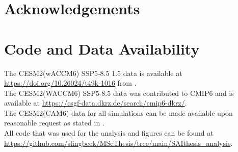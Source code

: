 \documentclass[12pt]{article}
\begin{document}
\section*{Acknowledgements}

\newpage

\printbibliography
{}

\section*{Code and Data Availability}
The CESM2(wACCM6) SSP5-8.5 1.5 data is available at \href{https://doi.org/10.26024/t49k-1016}{https://doi.org/10.26024/t49k-1016} from \textcite{tilmes2020}.\\
The CESM2(WACCM6) SSP5-8.5 data was contributed to CMIP6 and is available at \href{https://esgf-data.dkrz.de/search/cmip6-dkrz/}{https://esgf-data.dkrz.de/search/cmip6-dkrz/}.\\
The CESM2(CAM6) data for all simulations can be made available upon reasonable request as stated in \textcite{pfluger2024}.\\
All code that was used for the analysis and figures can be found at\\
\href{https://github.com/slingbeek/MScThesis/tree/main/SAIthesis\_analysis}{https://github.com/slingbeek/MScThesis/tree/main/SAIthesis\_analysis}.
\newpage
\appendix

\end{document}
